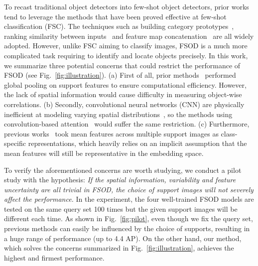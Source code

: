 \documentclass[journal]{IEEEtran}
\begin{document}
To recast traditional object detectors into few-shot object detectors, prior works tend to leverage the methods that have been proved effective at few-shot classification (FSC).
The techniques such as building category prototypes~\cite{snell2017prototypical, karlinsky2019repmet}, ranking similarity between inputs~\cite{koch2015siamese, fan2020few} and feature map concatenation~\cite{sung2018learning, fan2020fgn} are all widely adopted.
However, unlike FSC aiming to classify images, FSOD is a much more complicated task requiring to identify and locate objects precisely.
In this work, we summarize three potential concerns that could restrict the performance of FSOD (see Fig.~\ref{fig:illustration}).
(a) First of all, prior methods~\cite{karlinsky2019repmet, kang2019few, yan2019meta, fan2020fgn, perez2020incremental, liu2020crnet} performed global pooling on support features to ensure computational efficiency.
However, the lack of spatial information would cause difficulty in measuring object-wise correlations.
(b) Secondly, convolutional neural networks (CNN) are physically inefficient at modeling varying spatial distributions~\cite{hu2019local}, so the methods using convolution-based attention~\cite{bertinetto2016fully, fan2020fgn} would suffer the same restriction.
(c) Furthermore, previous works~\cite{karlinsky2019repmet, kang2019few, yan2019meta, fan2020fgn, fan2020few, perez2020incremental} took mean features across multiple support images as class-specific representations, which heavily relies on an implicit assumption that the mean features will still be representative in the embedding space.


To verify the aforementioned concerns are worth studying, we conduct a pilot study with the hypothesis: \textit{If the spatial information, variability and feature uncertainty are all trivial in FSOD, the choice of support images will not severely affect the performance.}
In the experiment, the four well-trained FSOD models are tested on the same query set 100 times but the given support images will be different each time.
As shown in Fig.~\ref{fig:pilot}, even though we fix the query set, previous methods can easily be influenced by the choice of supports, resulting in a huge range of performance (up to 4.4 AP).
On the other hand, our method, which solves the concerns summarized in Fig.~\ref{fig:illustration}, achieves the highest and firmest performance.
\end{document}

